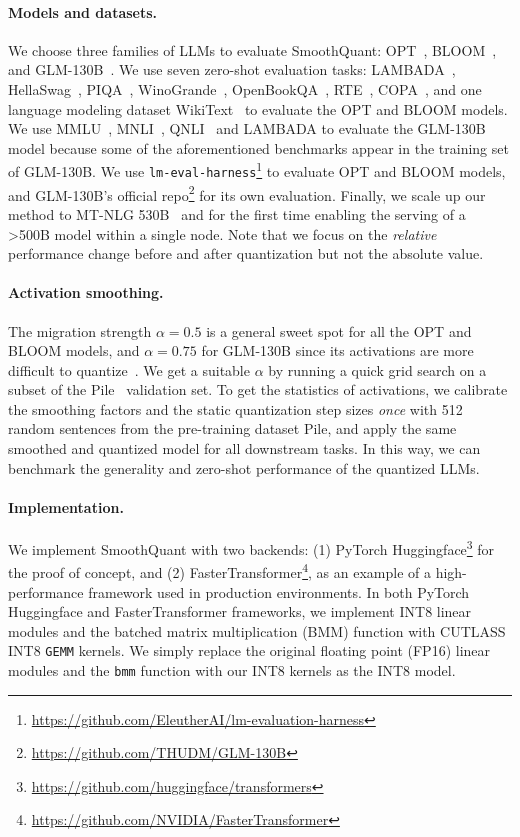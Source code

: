 \paragraph{Models and datasets.} We choose three families of LLMs to evaluate SmoothQuant: OPT~\cite{opt}, BLOOM~\cite{scao2022bloom}, and GLM-130B~\cite{zeng2022glm}. We use seven zero-shot evaluation tasks: LAMBADA~\cite{paperno-etal-2016-lambada}, HellaSwag~\cite{hellaswag}, PIQA~\cite{Bisk2020piqa}, WinoGrande~\cite{sakaguchi2019winogrande}, OpenBookQA~\cite{OpenBookQA2018}, RTE~\cite{glue}, COPA~\cite{copa}, and one language modeling dataset WikiText~\cite{merity2016pointer} to evaluate the OPT and BLOOM models. We use MMLU~\cite{mmlu}, MNLI~\cite{mnli}, QNLI~\cite{glue} and LAMBADA to evaluate the GLM-130B model because some of the aforementioned benchmarks appear in the training set of GLM-130B. We use {\texttt{lm-eval-harness}}\footnote{\url{https://github.com/EleutherAI/lm-evaluation-harness}} to evaluate OPT and BLOOM models, and GLM-130B's official repo\footnote{\url{https://github.com/THUDM/GLM-130B}} for its own evaluation. Finally, we scale up our method to MT-NLG 530B~\cite{smith2022using} and for the first time enabling the serving of a >500B model within a single node. Note that we focus on the \emph{relative} performance change before and after quantization but not the absolute value.

\paragraph{Activation smoothing.} The migration strength $\alpha=0.5$ is a general sweet spot for all the OPT and BLOOM models, and $\alpha=0.75$ for GLM-130B since its activations are more difficult to quantize~\cite{zeng2022glm}. We get a suitable $\alpha$ by running a quick grid search on a subset of the Pile~\cite{gao2020pile} validation set. To get the statistics of activations, we calibrate the smoothing factors and the static quantization step sizes \emph{once} with 512 random sentences from the pre-training dataset Pile, and apply the same smoothed and quantized model for all downstream tasks. In this way, we can benchmark the generality and zero-shot performance of the quantized LLMs.

\paragraph{Implementation.}
We implement SmoothQuant with two backends: (1) PyTorch Huggingface\footnote{\url{https://github.com/huggingface/transformers}} for the proof of concept, and (2) FasterTransformer\footnote{\url{https://github.com/NVIDIA/FasterTransformer}}, as an example of a high-performance framework used in production environments. In both PyTorch Huggingface and FasterTransformer frameworks, we implement INT8 linear modules and the batched matrix multiplication (BMM) function with CUTLASS INT8 \texttt{GEMM} kernels. We simply replace the original floating point (FP16) linear modules and the \texttt{bmm} function with our INT8 kernels as the INT8 model.

